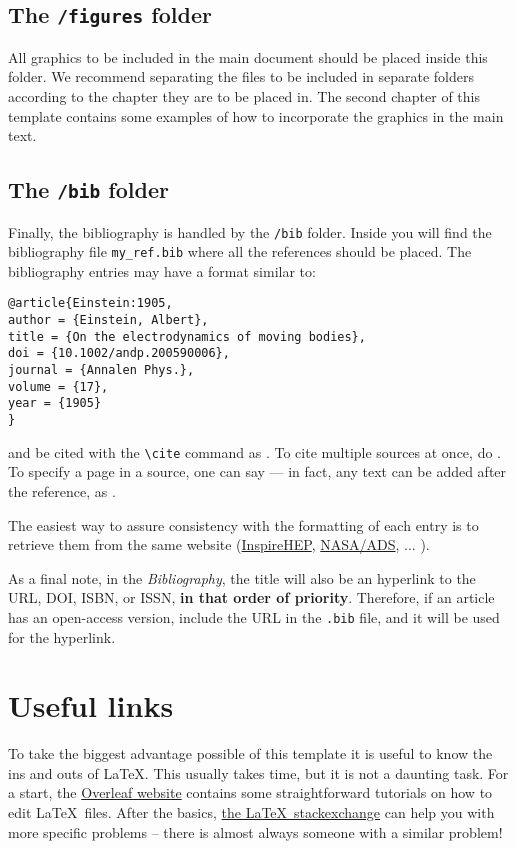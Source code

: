 \subsection{The {\normalfont\texttt{/figures}} folder} %
%
All graphics to be included in the main document should be placed inside this folder. We recommend separating the files to be included in separate folders according to the chapter they are to be placed in. The second chapter of this template contains some examples of how to incorporate the graphics in the main text.

\subsection{The {\normalfont\texttt{/bib}} folder} %

Finally, the bibliography is handled by the \texttt{/bib} folder. Inside you will find the bibliography file \texttt{my\_ref.bib} where all the references should be placed. The bibliography entries may have a format similar to:

\begin{verbatim}
@article{Einstein:1905,
author = {Einstein, Albert},
title = {On the electrodynamics of moving bodies},
doi = {10.1002/andp.200590006},
journal = {Annalen Phys.},
volume = {17},
year = {1905}
}
\end{verbatim}
%
and be cited with the \verb|\cite| command as \cite{Einstein:1905}. To cite multiple sources at once, do \cite{FeynCalc:1991,FeynCalc:2016,FeynCalc:2020}. To specify a page in a source, one can say \cite[p.~500]{Dokshitzer:1991} --- in fact, any text can be added after the reference, as \cite[Any text you might want]{Peskin:1995}.

The easiest way to assure consistency with the formatting of each entry is to retrieve them from the same website (\href{https://inspirehep.net/}{InspireHEP}, \href{https://ui.adsabs.harvard.edu/}{NASA/ADS}, ... ).

As a final note, in the \textit{Bibliography}, the title will also be an hyperlink to the URL, DOI, ISBN, or ISSN, \textbf{in that order of priority}. Therefore, if an article has an open-access version, include the URL in the \texttt{.bib} file, and it will be used for the hyperlink.

\section{Useful links}
%
To take the biggest advantage possible of this template it is useful to know the ins and outs of \LaTeX. This usually takes time, but it is not a daunting task. For a start, the \href{https://www.overleaf.com/learn}{Overleaf website} contains some straightforward tutorials on how to edit \LaTeX\, files. After the basics, \href{https://tex.stackexchange.com}{the \LaTeX\, stackexchange} can help you with more specific problems -- there is almost always someone with a similar problem!

